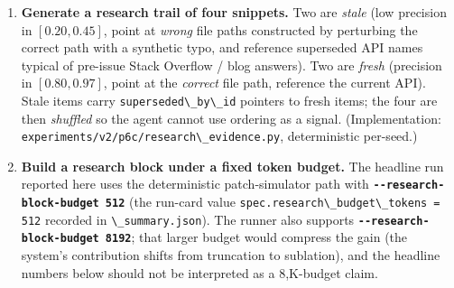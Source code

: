\begin{enumerate}
\def\labelenumi{\arabic{enumi}.}
\item
  \textbf{Generate a research trail of four snippets.} Two are \emph{stale} (low precision in \([0.20, 0.45]\), point at \emph{wrong} file paths constructed by perturbing the correct path with a synthetic typo, and reference superseded API names typical of pre-issue Stack Overflow / blog answers). Two are \emph{fresh} (precision in \([0.80, 0.97]\), point at the \emph{correct} file path, reference the current API). Stale items carry \passthrough{\lstinline!superseded\_by\_id!} pointers to fresh items; the four are then \emph{shuffled} so the agent cannot use ordering as a signal. (Implementation: \passthrough{\lstinline!experiments/v2/p6c/research\_evidence.py!}, deterministic per-seed.)
\item
  \textbf{Build a research block under a fixed token budget.} The headline run reported here uses the deterministic patch-simulator path with \textbf{\passthrough{\lstinline!--research-block-budget 512!}} (the run-card value \passthrough{\lstinline!spec.research\_budget\_tokens = 512!} recorded in \passthrough{\lstinline!\_summary.json!}). The runner also supports \textbf{\passthrough{\lstinline!--research-block-budget 8192!}}; that larger budget would compress the gain (the system's contribution shifts from truncation to sublation), and the headline numbers below should not be interpreted as a 8,K-budget claim.


\end{enumerate}
